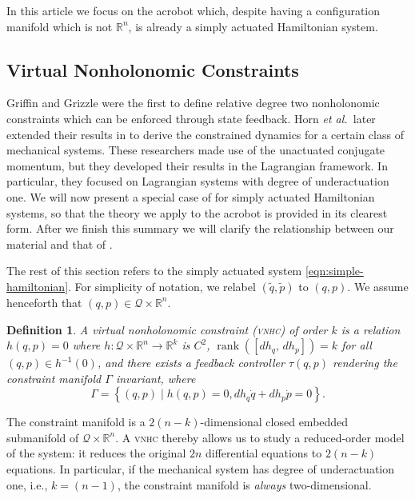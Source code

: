\documentclass[journal,twoside,web, twocolumn,draftcls]{ieeecolor}
\newtheorem{defn}{Definition} %
\DeclareMathOperator{\Rank}{rank}
\newcommand*{\rank}[1]{\Rank\left(#1\right)}
\newcommand*{\inv}{^\mathsf{-1}}
\newcommand*{\R}{\mathbb{R}}
\renewcommand*{\Re}{\mathbb{R}}
\newcommand*{\etal}{\MakeLowercase{\textit{et al.~}}}
\newcommand*{\cQ}{\mathcal{Q}}
\newcommand*{\vnhc}{\textsc{vnhc}\xspace}
\begin{document}
In this article we focus on the acrobot which, despite having a configuration
manifold which is not \(\R^n\), is already a simply actuated Hamiltonian system.

\subsection{Virtual Nonholonomic Constraints}\label{sec:vnhc-vnhc}

Griffin and Grizzle \cite{nhvc_dynamic_walking} were the first to define relative degree two nonholonomic constraints which can be enforced through state feedback. Horn \etal later extended their results in \cite{hybrid_zero_dynamics_bipedal_nhvcs} to derive the constrained dynamics for a certain class of mechanical systems. These researchers made use of the unactuated conjugate momentum, but they developed their results in the Lagrangian framework. In particular, they focused on Lagrangian systems with degree of underactuation one. We will now present a special case of \cite{hybrid_zero_dynamics_bipedal_nhvcs} for simply actuated Hamiltonian systems, so that the theory we apply to the acrobot is provided in its clearest form. After we finish this summary we will clarify the relationship between our material and that of \cite{hybrid_zero_dynamics_bipedal_nhvcs}.

The rest of this section refers to the simply actuated system \eqref{eqn:simple-hamiltonian}. For simplicity of notation, we relabel \((\tilde{q},\tilde{p})\) to \((q,p)\). We assume henceforth that $(q,p) \in \cQ \times \Re^n$.

\begin{defn}\label{defn:vnhc}
    A \textit{virtual nonholonomic constraint} (\vnhc) \textit{of order \(k\)} is a     relation \(h(q,p) = 0\) where \(h : \mathcal{Q}\times\R^n \rightarrow \R^k\) is     \(C^2\), \(\rank{\left[ dh_q,\, dh_p \right]} = k\) for all      \((q,p) \in h\inv(0)\), and there exists a feedback controller \(\tau(q,p)\)     rendering the \textit{constraint manifold} \(\Gamma\) invariant,     where
    \begin{equation}
        \Gamma = \left\{(q,p) \mid h(q,p) = 0, dh_q \dot{q} + dh_p \dot{p} = 0\right\}
        .
    \end{equation}
\end{defn}

The constraint manifold is a \(2(n-k)\)-dimensional closed embedded submanifold of \(\mathcal{Q} \times \R^n\). A \vnhc thereby allows us to study a reduced-order model of the system: it reduces the original \(2n\) differential equations to \(2(n-k)\) equations. In particular, if the mechanical system has degree of underactuation one, i.e., \(k = (n-1)\), the constraint manifold is \textit{always} two-dimensional.
\end{document}
